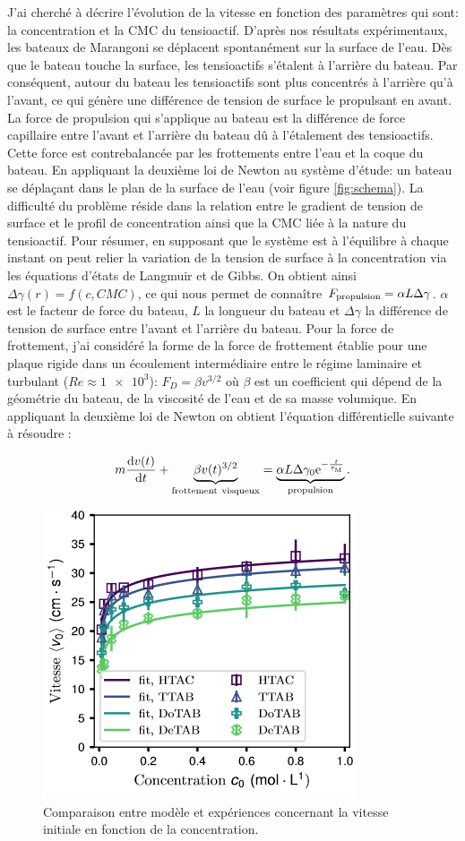 \documentclass[french, 10pt]{article}
\begin{document}
J'ai cherché à décrire l'évolution de la vitesse en fonction des paramètres qui sont: la concentration et la CMC du tensioactif. D'après nos résultats expérimentaux, les bateaux de Marangoni se déplacent spontanément sur la surface de l'eau. Dès que le bateau touche la surface, les tensioactifs s'étalent à l'arrière du bateau. Par conséquent, autour du bateau les tensioactifs sont plus concentrés à l'arrière qu'à l'avant, ce qui génère une différence de tension de surface le propulsant en avant. La force de propulsion qui s'applique au bateau est la différence de force capillaire entre l'avant et l'arrière du bateau dû à l'étalement des tensioactifs. Cette force est contrebalancée par les frottements entre l'eau et la coque du bateau. En appliquant la deuxième loi de Newton au système d'étude: un bateau se déplaçant dans le plan de la surface de l'eau (voir figure \ref{fig:schema}). La difficulté du problème réside dans la relation entre le gradient de tension de surface et le profil de concentration ainsi que la CMC liée à la nature du tensioactif. Pour résumer, en supposant que le système est à l'équilibre à chaque instant on peut relier la variation de la tension de surface à la concentration via les équations d'états de Langmuir et de Gibbs. On obtient ainsi $\Delta\gamma(r) = f(c, CMC)$, ce qui nous permet de connaître $F_{\rm propulsion} = \alpha L\Delta\gamma$. $\alpha$ est le facteur de force du bateau, $L$ la longueur du bateau et $\Delta\gamma$ la différence de tension de surface entre l'avant et l'arrière du bateau. Pour la force de frottement, j'ai considéré la forme de la force de frottement établie pour une plaque rigide dans un écoulement intermédiaire entre le régime laminaire et turbulant ($Re\approx \num{1e3}$): $F_{D} = \beta v^{3/2}$ où $\beta$ est un coefficient qui dépend de la géométrie du bateau, de la viscosité de l'eau et de sa masse volumique. En appliquant la deuxième loi de Newton on obtient l'équation différentielle suivante à résoudre : 

\begin{equation}
  m\frac{\mathrm{d}v(t)}{\mathrm{d}t} + \underbrace{\beta v(t)^{3/2}}_{\rm frottement~visqueux} = \underbrace{\alpha L\Delta\gamma_0{\rm e}^{-\frac{t}{\tau_{\rm M}}}}_{\rm propulsion}.
  \label{eqn:differentielle}
\end{equation}

\begin{figure}
  \centering
  \includegraphics[width=.4\textwidth]{V0C.png}
  \caption{Comparaison entre modèle et expériences concernant la vitesse initiale en fonction de la concentration.}
  \label{fig:vitessevo}  
\end{figure}
\end{document}
